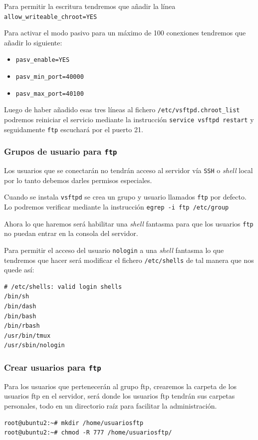 \documentclass[11pt]{article}
\begin{document}
Para permitir la escritura tendremos que añadir la línea \texttt{allow\_writeable\_chroot=YES}

Para activar el modo pasivo para un máximo de 100 conexiones tendremos que añadir lo siguiente:
\begin{itemize}
\item \texttt{pasv\_enable=YES}
\item \texttt{pasv\_min\_port=40000}
\item \texttt{pasv\_max\_port=40100}
\end{itemize}


Luego de haber añadido esas tres líneas al fichero \texttt{/etc/vsftpd.chroot\_list} podremos reiniciar el servicio mediante la instrucción \texttt{service vsftpd restart} y seguidamente \texttt{ftp} escuchará por el
puerto 21.

\subsubsection{Grupos de usuario para \texttt{ftp}}
\label{sec:orga6e601e}
Los usuarios que se conectarán no tendrán acceso al servidor vía \texttt{SSH} o \emph{shell} local por lo tanto debemos darles permisos especiales.

Cuando se instala \texttt{vsftpd} se crea un grupo y usuario llamados \texttt{ftp} por defecto. Lo podremos verificar mediante la instrucción \texttt{egrep -i ftp /etc/group}

Ahora lo que haremos será habilitar una \emph{shell} fantasma para que los usuarios \texttt{ftp} no puedan entrar en la consola del servidor.

Para permitir el acceso del usuario \texttt{nologin} a una \emph{shell} fantasma lo que tendremos que hacer será modificar el fichero \texttt{/etc/shells} de tal manera que nos quede así:
\begin{verbatim}
# /etc/shells: valid login shells
/bin/sh
/bin/dash
/bin/bash
/bin/rbash
/usr/bin/tmux
/usr/sbin/nologin
\end{verbatim}

\subsubsection{Crear usuarios para \texttt{ftp}}
\label{sec:orgc592f19}
Para los usuarios que pertenecerán al grupo ftp, crearemos la carpeta de los usuarios ftp en el servidor, será donde los usuarios ftp tendrán sus carpetas personales, todo en un directorio
raíz para facilitar la administración.
\begin{verbatim}
root@ubuntu2:~# mkdir /home/usuariosftp
root@ubuntu2:~# chmod -R 777 /home/usuariosftp/
\end{verbatim}
\end{document}
